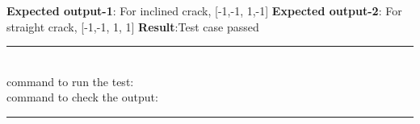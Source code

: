 \documentclass[fleqn, 12.5pt,a4paper]{report}
\begin{document}
\hspace{-0.5cm}\textbf{Expected output-1}: For inclined crack, [-1,-1, 1,-1] \newline
\textbf{Expected output-2}: For straight crack, [-1,-1, 1, 1]\newline
\textbf{Result}:Test case passed
\\
{\rule{\linewidth}{0.02cm}}\\
command to run the test: {\selectfont {}}\\
command to check the output: {\selectfont {}}\\
{ \rule{\linewidth}{0.02cm}}
\end{document}
